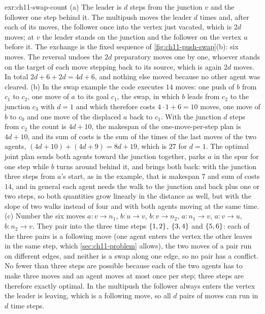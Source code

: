 \begin{solution}{exr:ch11-swap-count}
(a) The leader is $d$ steps from the junction $v$ and the follower one step behind it. The multipush moves the leader $d$ times and, after each of its moves, the follower once into the vertex just vacated, which is $2d$ moves; at $v$ the leader stands on the junction and the follower on the vertex $u$ before it. The exchange is the fixed sequence of \cref{fig:ch11-push-swap}(b): six moves. The reversal undoes the $2d$ preparatory moves one by one, whoever stands on the target of each move stepping back to its source, which is again $2d$ moves. In total $2d + 6 + 2d = 4d + 6$, and nothing else moved because no other agent was cleared. (b) In the swap example the code executes $14$ moves: one push of $b$ from $c_1$ to $c_2$, one move of $a$ to its goal $c_1$, the swap, in which $b$ leads from $c_2$ to the junction $c_3$ with $d = 1$ and which therefore costs $4 \cdot 1 + 6 = 10$ moves, one move of $b$ to $c_0$ and one move of the displaced $a$ back to $c_1$. With the junction $d$ steps from $c_2$ the count is $4d + 10$, the makespan of the one-move-per-step plan is $4d + 10$, and its sum of costs is the sum of the times of the last moves of the two agents, $(4d + 10) + (4d + 9) = 8d + 19$, which is $27$ for $d = 1$. The optimal joint plan sends both agents toward the junction together, parks $a$ in the spur for one step while $b$ turns around behind it, and brings both back: with the junction three steps from $a$'s start, as in the example, that is makespan $7$ and sum of costs $14$, and in general each agent needs the walk to the junction and back plus one or two steps, so both quantities grow linearly in the distance as well, but with the slope of two walks instead of four and with both agents moving at the same time. (c) Number the six moves $a: v \to n_1$, $b: u \to v$, $b: v \to n_2$, $a: n_1 \to v$, $a: v \to u$, $b: n_2 \to v$. They pair into the three time steps $\left\{ 1,2 \right\}$, $\left\{ 3,4 \right\}$ and $\left\{ 5,6 \right\}$: each of the three pairs is a following move (one agent enters the vertex the other leaves in the same step, which \cref{sec:ch11-problem} allows), the two moves of a pair run on different edges, and neither is a swap along one edge, so no pair has a conflict. No fewer than three steps are possible because each of the two agents has to make three moves and an agent moves at most once per step; three steps are therefore exactly optimal. In the multipush the follower always enters the vertex the leader is leaving, which is a following move, so all $d$ pairs of moves can run in $d$ time steps.
\end{solution}
